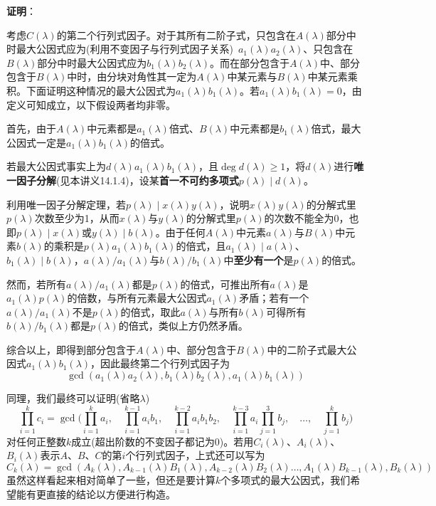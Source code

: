 \documentclass[a4paper,UTF8,fontset=windows,AutoFakeBold]{ctexart}
\newcommand{\proo}[1]{{\vspace{5pt}\kaishu\noindent\textbf{证明}：\vspace{-3pt}
\begin{compactitem}
    \item[] #1
\end{compactitem}
}}
\begin{document}
\proo{
    考虑$C(\lambda)$的第二个行列式因子。对于其所有二阶子式，只包含在$A(\lambda)$部分中时最大公因式应为(利用不变因子与行列式因子关系)\ $a_1(\lambda)a_2(\lambda)$、只包含在$B(\lambda)$部分中时最大公因式应为$b_1(\lambda)b_2(\lambda)$。而在部分包含于$A(\lambda)$中、部分包含于$B(\lambda)$中时，由分块对角性其一定为$A(\lambda)$中某元素与$B(\lambda)$中某元素乘积。下面证明这种情况的最大公因式为$a_1(\lambda)b_1(\lambda)$。若$a_1(\lambda)b_1(\lambda)=0$，由定义可知成立，以下假设两者均非零。

    首先，由于$A(\lambda)$中元素都是$a_1(\lambda)$倍式、$B(\lambda)$中元素都是$b_1(\lambda)$倍式，最大公因式一定是$a_1(\lambda)b_1(\lambda)$的倍式。

    若最大公因式事实上为$d(\lambda)a_1(\lambda)b_1(\lambda)$，且$\deg d(\lambda)\ge1$，将$d(\lambda)$进行\textbf{唯一因子分解}(见本讲义14.1.4)，设某\textbf{首一不可约多项式}$p(\lambda)\mid d(\lambda)$。

    利用唯一因子分解定理，若$p(\lambda)\mid x(\lambda)y(\lambda)$，说明$x(\lambda)y(\lambda)$的分解式里$p(\lambda)$次数至少为1，从而$x(\lambda)$与$y(\lambda)$的分解式里$p(\lambda)$的次数不能全为0，也即$p(\lambda)\mid x(\lambda)$或$y(\lambda)\mid b(\lambda)$。由于任何$A(\lambda)$中元素$a(\lambda)$与$B(\lambda)$中元素$b(\lambda)$的乘积是$p(\lambda)a_1(\lambda)b_1(\lambda)$的倍式，且$a_1(\lambda)\mid a(\lambda)$、$b_1(\lambda)\mid b(\lambda)$，$a(\lambda)/a_1(\lambda)$与$b(\lambda)/b_1(\lambda)$中\textbf{至少有一个}是$p(\lambda)$的倍式。

    然而，若所有$a(\lambda)/a_1(\lambda)$都是$p(\lambda)$的倍式，可推出所有$a(\lambda)$是$a_1(\lambda)p(\lambda)$的倍数，与所有元素最大公因式$a_1(\lambda)$矛盾；若有一个$a(\lambda)/a_1(\lambda)$不是$p(\lambda)$的倍式，取此$a(\lambda)$与所有$b(\lambda)$可得所有$b(\lambda)/b_1(\lambda)$都是$p(\lambda)$的倍式，类似上方仍然矛盾。

    综合以上，即得到部分包含于$A(\lambda)$中、部分包含于$B(\lambda)$中的二阶子式最大公因式$a_1(\lambda)b_1(\lambda)$，因此最终第二个行列式因子为
    $$\gcd(a_1(\lambda)a_2(\lambda),b_1(\lambda)b_2(\lambda),a_1(\lambda)b_1(\lambda))$$
}

同理，我们最终可以证明(省略$\lambda$)
$$\prod_{i=1}^kc_i=\gcd\bigg(\prod_{i=1}^ka_i,\quad\prod_{i=1}^{k-1}a_ib_1,\quad\prod_{i=1}^{k-2}a_ib_1b_2,\quad\prod_{i=1}^{k-3}a_i\prod_{j=1}^3b_j,\quad\dots,\quad\prod_{j=1}^kb_j\bigg)$$
对任何正整数$k$成立(超出阶数的不变因子都记为0)。若用$C_i(\lambda)$、$A_i(\lambda)$、$B_i(\lambda)$表示$A$、$B$、$C$的第$i$个行列式因子，上式还可以写为
$$C_k(\lambda)=\gcd(A_k(\lambda),A_{k-1}(\lambda)B_1(\lambda),A_{k-2}(\lambda)B_2(\lambda)\dots,A_1(\lambda)B_{k-1}(\lambda),B_k(\lambda))$$
虽然这样看起来相对简单了一些，但还是要计算$k$个多项式的最大公因式，我们希望能有更直接的结论以方便进行构造。
\end{document}

